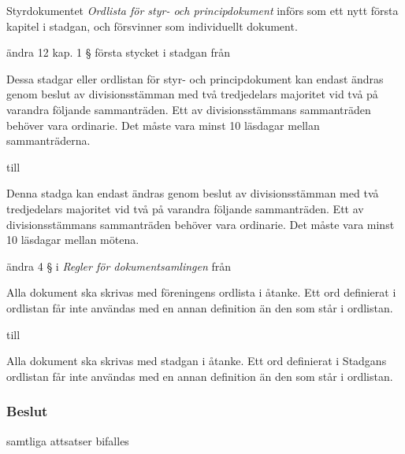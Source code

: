 \documentclass[protokoll]{dvd}
\begin{document}
\begin{attsatser}
	\item Styrdokumentet \emph{Ordlista för styr- och principdokument} införs som ett nytt första kapitel i stadgan, och försvinner som individuellt dokument.

	\item ändra 12 kap. 1 § första stycket i stadgan från

	\begin{displayquote}
		Dessa stadgar eller ordlistan för styr- och principdokument kan endast ändras genom beslut av divisionsstämman med två tredjedelars majoritet vid två på varandra följande sammanträden.
		Ett av divisionsstämmans sammanträden behöver vara ordinarie.
		Det måste vara minst 10 läsdagar mellan sammanträderna.
	\end{displayquote}

	till

	\begin{displayquote}
		Denna stadga kan endast ändras genom beslut av divisionsstämman med två tredjedelars majoritet vid två på varandra följande sammanträden.
		Ett av divisionsstämmans sammanträden behöver vara ordinarie.
		Det måste vara minst 10 läsdagar mellan mötena.
	\end{displayquote}

	\item ändra 4 § i \emph{Regler för dokumentsamlingen} från

	\begin{displayquote}
		Alla dokument ska skrivas med föreningens ordlista i åtanke.
		Ett ord definierat i ordlistan får inte användas med en annan definition än den som står i ordlistan.
	\end{displayquote}

	till

	\begin{displayquote}
        Alla dokument ska skrivas med stadgan i åtanke.
        Ett ord definierat i Stadgans ordlistan får inte användas med en annan definition än den som står i ordlistan.
    \end{displayquote}
\end{attsatser}

\subsubsection*{Beslut}
    \begin{attsatser}
        \item samtliga attsatser bifalles
    \end{attsatser}
\end{document}
